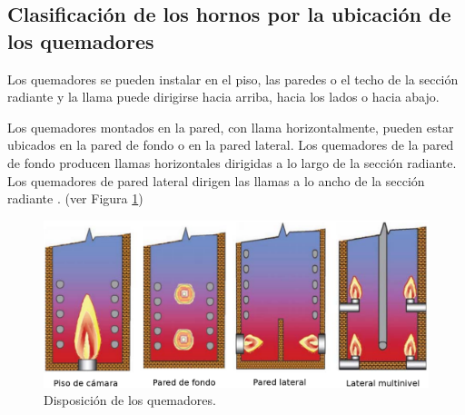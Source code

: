\subsection{Clasificación de los hornos por la ubicación de los quemadores}
\par Los quemadores se pueden instalar en el piso, las paredes o el techo de la sección radiante y la llama puede dirigirse hacia arriba, hacia los lados o hacia abajo. 
\par Los quemadores montados en la pared, con llama horizontalmente, pueden estar ubicados en la pared de fondo o en la pared lateral. Los quemadores de la pared de fondo producen llamas horizontales dirigidas a lo largo de la sección radiante. Los quemadores de pared lateral dirigen las llamas a lo ancho de la sección radiante \cite{kumar}. (ver Figura \ref{fig:quemadores})
\begin{figure}[H]
\begin{center}
\includegraphics[scale=0.30]{images/quemadores}
\caption[Disposición de los quemadores]{Disposición de los quemadores.\cite{kumar}}
\label{fig:quemadores}
\end{center}
\end{figure}

